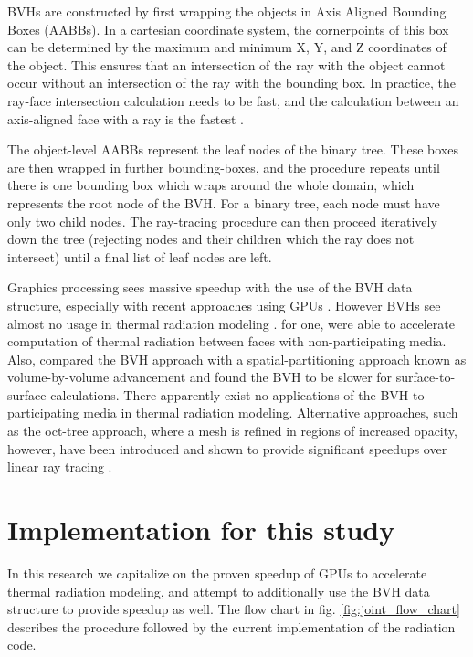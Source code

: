 BVHs are constructed by first wrapping the objects in Axis Aligned Bounding Boxes (AABBs). In a cartesian coordinate system, the cornerpoints of this box can be determined by the maximum and minimum X, Y, and Z coordinates of the object.
This ensures that an intersection of the ray with the object cannot occur without an intersection of the ray with the bounding box. 
In practice, the ray-face intersection calculation needs to be fast, and the calculation between an axis-aligned face with a ray is the fastest \cite{Kay1986RayScenes}.

The object-level AABBs represent the leaf nodes of the binary tree. These boxes are then wrapped in further bounding-boxes, and the procedure repeats until there is one bounding box which wraps around the whole domain, which represents the root node of the BVH. 
For a binary tree, each node must have only two child nodes. The ray-tracing procedure can then proceed iteratively down the tree (rejecting nodes and their children which the ray does not intersect) until a final list of leaf nodes are left.

Graphics processing sees massive speedup with the use of the BVH data structure, especially with recent approaches using GPUs \cite{Nery2013ParallelGPGPUs,Meister2021ATracing,Karras2012MaximizingTrees}.
However BVHs see almost no usage in thermal radiation modeling \cite{Liu2020TheFlames}.
\citet{Kuczynskia2014RadiationBoundaries} for one, were able to accelerate computation of thermal radiation between faces with non-participating media. 
Also, \citet{Mazumder2006MethodsTransport} compared the BVH approach with a spatial-partitioning approach known as volume-by-volume advancement and found the BVH to be slower for surface-to-surface calculations. 
There apparently exist no applications of the BVH to participating media in thermal radiation modeling. Alternative approaches, such as the oct-tree approach, where a mesh is refined in regions of increased opacity, however, have been introduced and shown to provide significant speedups over linear ray tracing \cite{Saftly2013UsingNote}.

\section{Implementation for this study} \label{section:ModelForThisStudy}
In this research we capitalize on the proven speedup of GPUs to accelerate thermal radiation modeling, and attempt to additionally use the BVH data structure to provide speedup as well.
The flow chart in fig. \ref{fig:joint_flow_chart} describes the procedure followed by the current implementation of the radiation code.

